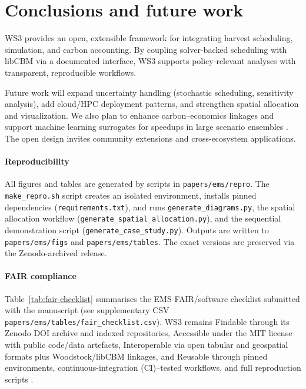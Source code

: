 \documentclass[review]{elsarticle}
\begin{document}
\section{Conclusions and future work}
WS3 provides an open, extensible framework for integrating harvest scheduling, simulation, and carbon accounting. By coupling solver-backed scheduling with libCBM via a documented interface, WS3 supports policy-relevant analyses with transparent, reproducible workflows.

Future work will expand uncertainty handling (stochastic scheduling, sensitivity analysis), add cloud/HPC deployment patterns, and strengthen spatial allocation and visualization. We also plan to enhance carbon–economics linkages and support machine learning surrogates for speedups in large scenario ensembles \citep{forrester2008surrogatemodelling}. The open design invites community extensions and cross-ecosystem applications.

\paragraph{Reproducibility}
All figures and tables are generated by scripts in \texttt{papers/ems/repro}. The \texttt{make\_repro.sh} script creates an isolated environment, installs pinned dependencies (\texttt{requirements.txt}), and runs \texttt{generate\_diagrams.py}, the spatial allocation workflow (\texttt{generate\_spatial\_allocation.py}), and the sequential demonstration script (\texttt{generate\_case\_study.py}). Outputs are written to \texttt{papers/ems/figs} and \texttt{papers/ems/tables}. The exact versions are preserved via the Zenodo-archived release.

\paragraph{FAIR compliance}
Table~\ref{tab:fair-checklist} summarises the EMS FAIR/software checklist submitted with the manuscript (see supplementary CSV \texttt{papers/ems/tables/fair\_checklist.csv}). WS3 remains Findable through its Zenodo DOI archive and indexed repositories, Accessible under the MIT license with public code/data artefacts, Interoperable via open tabular and geospatial formats plus Woodstock/libCBM linkages, and Reusable through pinned environments, continuous-integration (CI)–tested workflows, and full reproduction scripts \citep{ws3_zenodo2025}.
\end{document}
